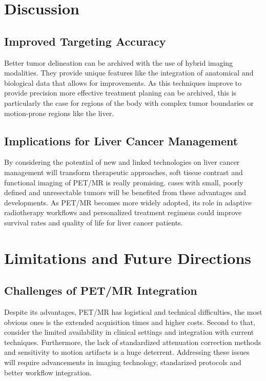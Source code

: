 \documentclass[11pt]{article} %
\begin{document}
\begin{multicols}{2}
\section{Discussion}

\subsection{Improved Targeting Accuracy}
Better tumor delineation can be archived with the use of hybrid imaging modalities. They provide unique features like the integration of anatomical and biological data that allows for improvements. As this techniques improve to provide precision more effective treatment planing can be archived, this is particularly the case for regions of the body with complex tumor boundaries or motion-prone regions like the liver.


\subsection{Implications for Liver Cancer Management}
By considering the potential of new and linked technologies on liver cancer management will transform therapeutic approaches, soft tissue contrast and functional imaging of PET/MR is really promising. cases with small, poorly defined and unresectable tumors will be benefited from these advantages and developments. As PET/MR becomes more widely adopted, its role in adaptive radiotherapy workflows and personalized treatment regimens could improve survival rates and quality of life for liver cancer patients.

\section{Limitations and Future Directions}

\subsection{Challenges of PET/MR Integration}

Despite its advantages, PET/MR has logistical and technical difficulties, the most obvious ones is the extended acquisition times and higher costs. Second to that, consider the limited availability in clinical settings and integration with current techniques. Furthermore, the lack of standardized attenuation correction methods and sensitivity to motion artifacts is a huge deterrent. Addressing these issues will require advancements in imaging technology, standarized protocols and better workflow integration.


\end{multicols}
\end{document}
